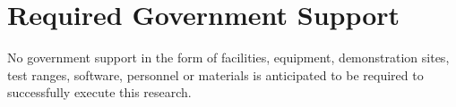 
\section{Required Government Support} %
No government support in the form of facilities, equipment, demonstration sites, test ranges, software, personnel or materials is anticipated to be required to successfully execute this research.